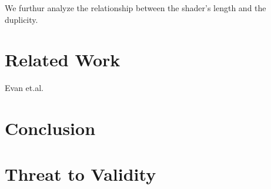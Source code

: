 
We furthur analyze the relationship between the shader's length and the duplicity.



\section{Related Work}


Evan et.al.\ \cite{evans_3d_2014}

\section{Conclusion}

\section{Threat to Validity}
